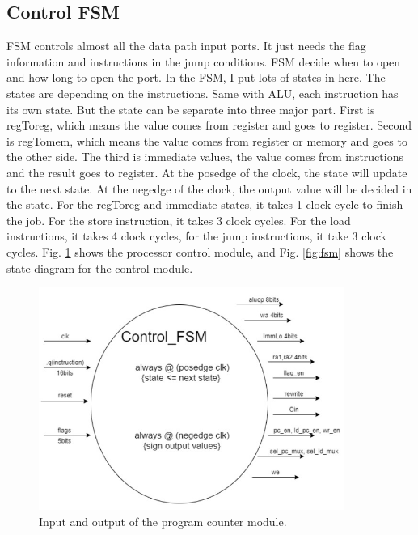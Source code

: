 \documentclass[../ProjectDocumentation.tex]{subfiles}
\begin{document}
\subsection{Control FSM}
FSM controls almost all the data path input ports. It just needs the flag information and
instructions in the jump conditions. FSM decide when to open and how long to open the port.
In the FSM, I put lots of states in here. The states are depending on the instructions. Same with
ALU, each instruction has its own state. But the state can be separate into three major part. First
is regToreg, which means the value comes from register and goes to register. Second is
regTomem, which means the value comes from register or memory and goes to the other side.
The third is immediate values, the value comes from instructions and the result goes to register.
At the posedge of the clock, the state will update to the next state. At the negedge of the clock,
the output value will be decided in the state.
For the regToreg and immediate states, it takes 1 clock cycle to finish the job. For the store
instruction, it takes 3 clock cycles. For the load instructions, it takes 4 clock cycles, for the jump
instructions, it take 3 clock cycles. Fig. \ref{fig:fsm_diag} shows the processor control module, and Fig. \ref{fig:fsm} shows the state diagram for the control module.

\begin{figure}
\centering
\includegraphics[width=10cm]{fsm_diag}
\caption{Input and output of the program counter module.}
\label{fig:fsm_diag}
\end{figure}
\end{document}
